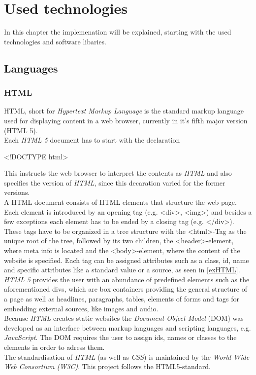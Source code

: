 
\chapter{Used technologies}
  \label{technologies}

In this chapter the implemenation will be explained, starting with the used technologies and software libaries.
\section{Languages}
\subsection{HTML}
HTML, short for \textit{Hypertext Markup Language} is the standard markup language used for displaying content in a web browser, currently in it's fifth major version (HTML 5).\\
Each \textit{HTML 5} document has to start with the declaration 
\begin{center}
\textless !DOCTYPE html\textgreater
\end{center}
This instructs the web browser to interpret the contents as \textit{HTML} and also specifies the version of \textit{HTML}, since this decaration varied for the former versions.\\
A HTML document consists of HTML elements that structure the web page. Each element is introduced by an opening tag (e.g. \textless div\textgreater, \textless img\textgreater) and besides a few exceptions each element has to be ended by a closing tag (e.g. \textless /div\textgreater). These tags have to be organized in a tree structure with the \textless html\textgreater-Tag as the unique root of the tree, followed by its two children, the \textless header\textgreater-element, where meta info is located and the \textless body\textgreater-element, where the content of the website is specified. Each tag can be assigned attributes such as a class, id, name and specific attributes like a standard value or a source, as seen in \autoref{exHTML}.\\
\textit{HTML 5} provides the user with an abundance of predefined elements such as the aforementioned divs, which are box containers providing the general structure of a page as well as headlines, paragraphs, tables, elements of forms and tags for embedding external sources, like images and audio.\\
Because \textit{HTML} creates static websites the \textit{Document Object Model} (DOM) was developed as an interface between markup languages and scripting languages, e.g. \textit{JavaScript}. The DOM requires the user to assign ids, names or classes to the elements in order to adress them. \\
The standardisation of \textit{HTML} (as well as \textit{CSS}) is maintained by the \textit{World Wide Web Consortium (W3C)}. This project follows the HTML5-standard.

